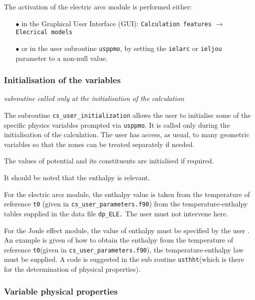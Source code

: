 {{The activation of the electric arcs module is performed either:
%
\begin{itemize}
 \item [$\bullet$] in the Graphical User Interface (GUI): \texttt{Calculation features} $\rightarrow$ \texttt{Elecrical models}
 \item [$\bullet$] or in the user subroutine \texttt{usppmo}, by setting the \texttt{ielarc} or \texttt{ieljou} parameter to a non-null value.
\end{itemize}

\subsubsection{Initialisation of the variables}

\noindent
\textit{subroutine called only at the initialisation of the calculation}

The subroutine \texttt{cs\_user\_initialization} allows the user to initialise some of the specific physics variables prompted via \texttt{usppmo}. It is called only during the initialisation of the calculation. The user has access, as usual, to many geometric variables so
 that the zones can be treated separately if needed.

The values of potential and its constituents are initialised if required.

It should be noted that the enthalpy is relevant.

\begin{list}{-}{}
\item For the electric arcs module, the enthalpy value is taken from the temperature
 of reference \texttt{t0} (given in \texttt{cs\_user\_parameters.f90}) from the temperature-enthalpy
 tables
 supplied in the data file \texttt{dp\_ELE.} The user must not intervene here.
\item For the Joule effect module, the value of enthalpy must be specified by the user
. An example is given of how to obtain the enthalpy from the temperature of reference
 \texttt{t0}(given in \texttt{cs\_user\_parameters.f90}), the temperature-enthalpy law must be
supplied. A code is suggested in the sub routine \texttt{usthht}(which is there for
 the determination of physical properties).
\end{list}

\subsubsection{Variable physical properties}

}}
